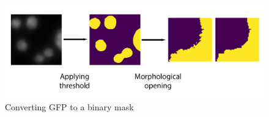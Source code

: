 \begin{figure}[H]
	\begin{center}
		\includegraphics[width=0.5\linewidth]{bilder/gfp/binary-bce/preprocessing/preprocessing-gfp.png}
		\caption{Converting GFP to a binary mask}\label{fig:gfp-binary}
	\end{center}
\end{figure}
